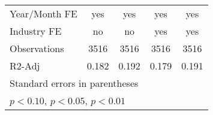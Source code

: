 \begin{table}[htbp]
\begin{tabular}{l*{4}{c}}
\hline
Year/Month FE   &      yes         &      yes         &      yes         &      yes         \\
Industry FE     &       no         &       no         &      yes         &      yes         \\
Observations    &     3516         &     3516         &     3516         &     3516         \\
R2-Adj          &    0.182         &    0.192         &    0.179         &    0.191         \\
\hline\hline
\multicolumn{5}{l}{\footnotesize Standard errors in parentheses}\\
\multicolumn{5}{l}{\footnotesize \sym{*} \(p<0.10\), \sym{**} \(p<0.05\), \sym{***} \(p<0.01\)}\\
\end{tabular}
\end{table}
